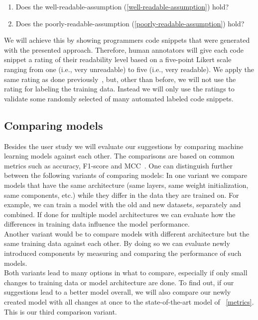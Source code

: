\documentclass[%
class=scrreprt,
chapterprefix=false,%
open=right,%
twoside=false,%
paper=a4,%
logofile={Logo\_zentral\_farbig\_EN.png},%
thesistype=masterproposal,%
UKenglish,%
]{se2thesis}
\begin{document}
	\begin{enumerate}
		\item Does the well-readable-assumption (\ref{well-readable-assumption}) hold?
		\item Does the poorly-readable-assumption (\ref{poorly-readable-assumption}) hold?
	\end{enumerate}
	
	We will achieve this by showing programmers code snippets that were generated with the presented approach. Therefore, human annotators will give each code snippet a rating of their readability level based on a five-point Likert scale~\cite{likert1932technique} ranging from one (i.e., very unreadable) to five (i.e., very readable). We apply the same rating as done previously~\cite{buse2009learning, dorn2012general, scalabrino2016improving}, but, other than before, we will not use the rating for labeling the training data. Instead we will only use the ratings to validate some randomly selected of many automated labeled code snippets.
		
	\subsection{Comparing models}\label{compare-models}\label{metrics}
	Besides the user study we will evaluate our suggestions by comparing machine learning models against each other.
	The comparisons are based on common metrics such as accuracy, F1-score and MCC~\cite{chicco2020advantages}. One can distinguish further between the following variants of comparing models:
	In one variant we compare models that have the same architecture (same layers, same weight initialization, same components, etc.) while they differ in the data they are trained on. For example, we can train a model with the old and new datasets, separately and combined. If done for multiple model architectures we can evaluate how the differences in training data influence the model performance.\\ 
	
	Another variant would be to compare models with different architecture but the same training data against each other. By doing so we can evaluate newly introduced components by measuring and comparing the performance of such models.\\
	
	Both variants lead to many options in what to compare, especially if only small changes to training data or model architecture are done. To find out, if our suggestions lead to a better model overall, we will also compare our newly created model with all changes at once to the state-of-the-art model of \citeauthor{mi2022towards}~\ref{metrics}. This is our third comparison variant.
\end{document}
